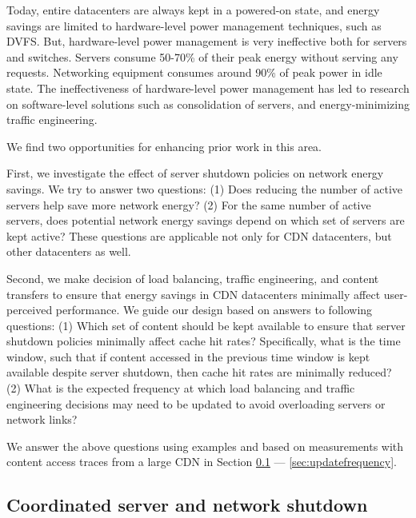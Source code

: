 Today, entire datacenters are always kept in a powered-on state, and energy savings are limited to hardware-level power management techniques, such as DVFS. But, hardware-level power management is very ineffective both for servers and switches. Servers consume 50-70\% of their peak energy without serving any requests. Networking equipment consumes around 90\% of peak power in idle state. The ineffectiveness of hardware-level power management has led to research on software-level solutions such as consolidation of servers, and energy-minimizing traffic engineering. 

We find two opportunities for enhancing prior work in this area. 

First, we investigate the effect of server shutdown policies on network energy savings. We try to answer two questions: (1) Does reducing the number of active servers help save more network energy? (2) For the same number of active servers, does potential network energy savings depend on which set of servers are kept active? These questions are applicable not only for CDN datacenters, but other datacenters as well. 

Second, we make decision of load balancing, traffic engineering, and content transfers  to ensure that energy savings in CDN datacenters minimally affect user-perceived performance. We guide our design based on answers to following questions: (1) Which set of content should be kept available to ensure that server shutdown policies minimally affect cache hit rates? Specifically, what is the time window, such that if content accessed in the previous time window is kept available despite server shutdown, then cache hit rates are minimally reduced? (2) What is the expected frequency at which load balancing and traffic engineering decisions may need to be updated to avoid overloading servers or network links?

We answer the above questions using examples and based on measurements with content access traces from a large CDN in  Section \ref{sec:jointopt} --- \ref{sec:updatefrequency}.

\subsection{Coordinated server and network shutdown}
\label{sec:jointopt}

